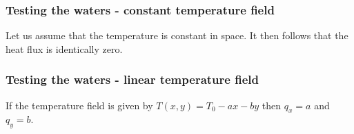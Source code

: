 \subsubsection{Testing the waters - constant temperature field}

Let us assume that the temperature is constant in space. It then follows that the heat flux is identically zero. 




\subsubsection{Testing the waters - linear temperature field}

If the temperature field is given by $T(x,y)=T_0 -a x- by$
then $q_x=a$ and $q_y=b$.







\newpage
